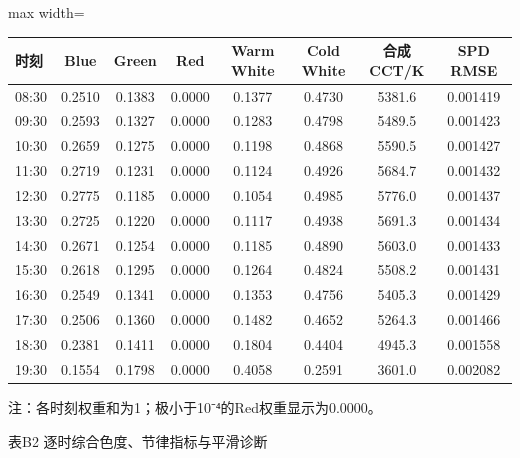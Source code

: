 \documentclass[UTF8,a4paper,12pt]{ctexart}
\begin{document}
\begin{table}[H]
\centering
\small
\begin{adjustbox}{max width=\textwidth}
\begin{tabular}{lccccccc}
\toprule
时刻 & Blue & Green & Red & Warm White & Cold White & 合成CCT/K & SPD RMSE \\
\midrule
08:30 & 0.2510 & 0.1383 & 0.0000 & 0.1377 & 0.4730 & 5381.6 & 0.001419 \\
09:30 & 0.2593 & 0.1327 & 0.0000 & 0.1283 & 0.4798 & 5489.5 & 0.001423 \\
10:30 & 0.2659 & 0.1275 & 0.0000 & 0.1198 & 0.4868 & 5590.5 & 0.001427 \\
11:30 & 0.2719 & 0.1231 & 0.0000 & 0.1124 & 0.4926 & 5684.7 & 0.001432 \\
12:30 & 0.2775 & 0.1185 & 0.0000 & 0.1054 & 0.4985 & 5776.0 & 0.001437 \\
13:30 & 0.2725 & 0.1220 & 0.0000 & 0.1117 & 0.4938 & 5691.3 & 0.001434 \\
14:30 & 0.2671 & 0.1254 & 0.0000 & 0.1185 & 0.4890 & 5603.0 & 0.001433 \\
15:30 & 0.2618 & 0.1295 & 0.0000 & 0.1264 & 0.4824 & 5508.2 & 0.001431 \\
16:30 & 0.2549 & 0.1341 & 0.0000 & 0.1353 & 0.4756 & 5405.3 & 0.001429 \\
17:30 & 0.2506 & 0.1360 & 0.0000 & 0.1482 & 0.4652 & 5264.3 & 0.001466 \\
18:30 & 0.2381 & 0.1411 & 0.0000 & 0.1804 & 0.4404 & 4945.3 & 0.001558 \\
19:30 & 0.1554 & 0.1798 & 0.0000 & 0.4058 & 0.2591 & 3601.0 & 0.002082 \\
\bottomrule
\end{tabular}
\end{adjustbox}
\end{table}

注：各时刻权重和为1；极小于10⁻⁴的Red权重显示为0.0000。

表B2  逐时综合色度、节律指标与平滑诊断
\end{document}
